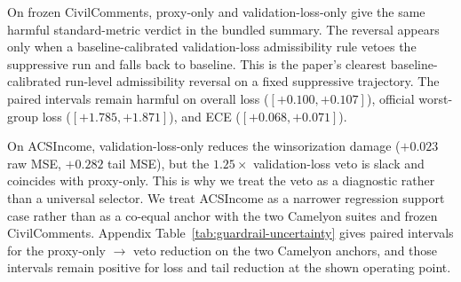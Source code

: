 On frozen CivilComments, proxy-only and validation-loss-only give the same harmful standard-metric verdict in the bundled summary.
The reversal appears only when a baseline-calibrated validation-loss admissibility rule vetoes the suppressive run and falls back to baseline.
This is the paper's clearest baseline-calibrated run-level admissibility reversal on a fixed suppressive trajectory.
The paired intervals remain harmful on overall loss ($[+0.100,+0.107]$), official worst-group loss ($[+1.785,+1.871]$), and ECE ($[+0.068,+0.071]$).

On ACSIncome, validation-loss-only reduces the winsorization damage ($+0.023$ raw MSE, $+0.282$ tail MSE), but the $1.25\times$ validation-loss veto is slack and coincides with proxy-only.
This is why we treat the veto as a diagnostic rather than a universal selector.
We treat ACSIncome as a narrower regression support case rather than as a co-equal anchor with the two Camelyon suites and frozen CivilComments.
Appendix Table~\ref{tab:guardrail-uncertainty} gives paired intervals for the proxy-only $\rightarrow$ veto reduction on the two Camelyon anchors, and those intervals remain positive for loss and tail reduction at the shown operating point.

\begin{table}[t]
  \centering
  \footnotesize
  \setlength{\tabcolsep}{2.5pt}
  
  \caption{
    Selector comparison with semantics made explicit.
    Top panel: absolute held-out metrics for the two Camelyon17 trajectories; bottom panel: delta-from-baseline verdicts for frozen CivilComments and ACSIncome.
    Selection epochs are shown only for the Camelyon absolute checkpoint rows; the frozen CivilComments and ACSIncome rows are compact delta-from-baseline verdict summaries.
    Reported policy identifies whether metrics come from the baseline run, the same suppressive trajectory, an admit-or-fallback mixed report, or pure baseline fallback.
    Suppressive-admit is the diagnostic verdict for the suppressive run; baseline rows are not applicable.
    Frozen CivilComments changes from admitted to vetoed under the validation-loss admissibility diagnostic; on ACSIncome, validation loss is milder but the $1.25\times$ veto is slack.
  }
  \label{tab:selector-comparison}
\end{table}

